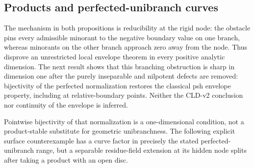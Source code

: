 \subsection{Products and perfected-unibranch curves}
\label{sec:ch15-envelope-products-unibranch}

The mechanism in both propositions is reducibility at the rigid node: the
obstacle pins every admissible minorant to the negative boundary value on one
branch, whereas minorants on the other branch approach zero away from the
node.  Thus
disprove an unrestricted local envelope theorem in every positive analytic
dimension.  The next result shows that this branching obstruction is sharp
in dimension one after the purely inseparable and nilpotent defects are
removed: bijectivity of the perfected normalization restores the classical
psh envelope property, including at relative-boundary points.  Neither the
CLD-v2 conclusion nor continuity of the envelope is inferred.



\begingroup
\makeatletter
\let\pzeroonethree@original@nonumberplain\th@nonumberplain
\def\th@nonumberplain{%
  \pzeroonethree@original@nonumberplain
  \def\@opargbegintheorem##1##2##3{%
    \item[\theorem@headerfont\hskip\labelsep ##3\theorem@separator]}}
\makeatother

\endgroup

Pointwise bijectivity of that normalization is a one-dimensional condition,
not a product-stable substitute for geometric unibranchness.  The following
explicit surface counterexample has a curve factor in precisely the stated
perfected-unibranch range, but a separable residue-field extension at its
hidden node splits after taking a product with an open disc.




